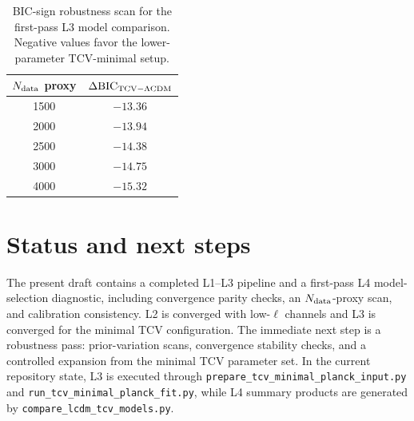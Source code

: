 \documentclass[aps,prd,onecolumn,nofootinbib,superscriptaddress]{revtex4-2}
\begin{document}
\begin{table}[t]
  \centering
  \begin{tabular}{cc}
    \hline\hline
    $N_{\rm data}$ proxy & $\Delta{\rm BIC}_{\rm TCV-\Lambda CDM}$ \\
    \hline
    1500 & $-13.36$ \\
    2000 & $-13.94$ \\
    2500 & $-14.38$ \\
    3000 & $-14.75$ \\
    4000 & $-15.32$ \\
    \hline\hline
  \end{tabular}
  \caption{BIC-sign robustness scan for the first-pass L3 model comparison.
  Negative values favor the lower-parameter TCV-minimal setup.}
  \label{tab:paper07_bic_scan}
\end{table}

\section{Status and next steps}
The present draft contains a completed L1--L3 pipeline and a first-pass L4
model-selection diagnostic, including convergence parity checks, an
$N_{\rm data}$-proxy scan, and calibration consistency.
L2 is converged with low-$\ell$ channels and L3 is converged for the minimal TCV
configuration.
The immediate next step is a robustness pass: prior-variation scans, convergence
stability checks, and a controlled expansion from the minimal TCV parameter set.
In the current repository state, L3 is executed through
\texttt{prepare\_tcv\_minimal\_planck\_input.py} and
\texttt{run\_tcv\_minimal\_planck\_fit.py}, while L4 summary products are
generated by \texttt{compare\_lcdm\_tcv\_models.py}.
\end{document}

